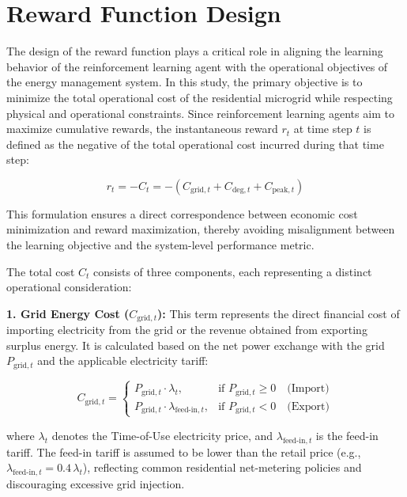 \section{Reward Function Design}

The design of the reward function plays a critical role in aligning the learning behavior of the reinforcement learning agent with the operational objectives of the energy management system. In this study, the primary objective is to minimize the total operational cost of the residential microgrid while respecting physical and operational constraints. Since reinforcement learning agents aim to maximize cumulative rewards, the instantaneous reward $r_t$ at time step $t$ is defined as the negative of the total operational cost incurred during that time step:

\begin{equation}
r_t = -C_t = - \left( C_{\text{grid},t} + C_{\text{deg},t} + C_{\text{peak},t} \right)
\end{equation}

This formulation ensures a direct correspondence between economic cost minimization and reward maximization, thereby avoiding misalignment between the learning objective and the system-level performance metric.

The total cost $C_t$ consists of three components, each representing a distinct operational consideration:

\textbf{1. Grid Energy Cost ($C_{\text{grid},t}$):}  
This term represents the direct financial cost of importing electricity from the grid or the revenue obtained from exporting surplus energy. It is calculated based on the net power exchange with the grid $P_{\text{grid},t}$ and the applicable electricity tariff:

\begin{equation}
C_{\text{grid},t} =
\begin{cases}
P_{\text{grid},t} \cdot \lambda_t, & \text{if } P_{\text{grid},t} \geq 0 \quad \text{(Import)} \\
P_{\text{grid},t} \cdot \lambda_{\text{feed-in},t}, & \text{if } P_{\text{grid},t} < 0 \quad \text{(Export)}
\end{cases}
\end{equation}

where $\lambda_t$ denotes the Time-of-Use electricity price, and $\lambda_{\text{feed-in},t}$ is the feed-in tariff. The feed-in tariff is assumed to be lower than the retail price (e.g., $\lambda_{\text{feed-in},t} = 0.4\,\lambda_t$), reflecting common residential net-metering policies and discouraging excessive grid injection.

